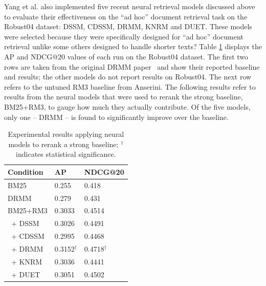 Yang et al. also implemented five recent neural retrieval models discussed above to evaluate their effectiveness on the ``ad hoc'' document retrieval task on the Robust04 dataset: DSSM, CDSSM, DRMM, KNRM and DUET.
These models were selected because they were specifically designed for ``ad hoc'' document retrieval unlike some others designed to handle shorter texts?
Table \ref{tab:exp-robust04} displays the AP and NDCG@20 values of each run on the Robust04 dataset.
The first two rows are taken from the original DRMM paper~\cite{guo2017drmm} and show their reported baseline and results; the other models do not report results on Robust04.
The next row refers to the untuned RM3 baseline from Anserini.
The following results refer to results from the neural models that were used to rerank the strong baseline, BM25+RM3, to gauge how much they actually contribute.
Of the five models, only one -- DRMM -- is found to significantly improve over the baseline.

\begin{table}[t]
\vspace{0.2cm}
\centering
\begin{tabular}{lll}
\toprule
\textbf{Condition} \mbox{\hspace{0.5cm}} & \textbf{AP} \mbox{\hspace{1.0cm}} & \textbf{NDCG@20} \\ 
\toprule
BM25~\cite{guo2016deep} & 0.255 & 0.418 \\
DRMM~\cite{guo2016deep} & 0.279 & 0.431 \\
BM25+RM3   & 0.3033      & 0.4514     \\
~+ DSSM    & 0.3026      & 0.4491     \\  
~+ CDSSM   & 0.2995      & 0.4468     \\
~+ DRMM    & 0.3152$^{\dagger}$  & 0.4718$^{\dagger}$ \\  
~+ KNRM    & 0.3036      & 0.4441     \\  
~+ DUET    & 0.3051      & 0.4502     \\ 
\bottomrule
\end{tabular}
\vspace{0.2cm}
\caption{Experimental results applying neural models to rerank a strong baseline; $^{\dagger}$ indicates statistical significance.}%
\label{tab:exp-robust04}
\vspace{-0.6cm}
\end{table}


